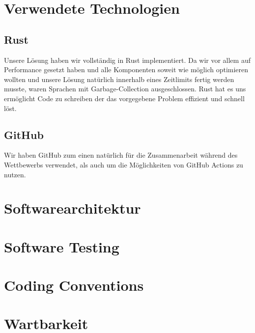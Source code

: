 \documentclass[12pt,a4paper]{article}
\begin{document}
\newpage
\section{Verwendete Technologien}

\subsection{Rust}
Unsere Lösung haben wir vollständig in Rust implementiert. Da wir vor allem auf Performance gesetzt haben und alle Komponenten soweit wie möglich optimieren wollten und unsere Lösung  natürlich innerhalb eines Zeitlimits fertig werden musste, waren Sprachen mit Garbage-Collection ausgeschlossen. Rust hat es uns ermöglicht Code zu schreiben der das vorgegebene Problem effizient und schnell löst.

\subsection{GitHub}
Wir haben GitHub zum einen natürlich für die Zusammenarbeit während des Wettbewerbs verwendet, als auch um die Möglichkeiten von GitHub Actions zu nutzen.


\section{Softwarearchitektur}

\section{Software Testing}

\section{Coding Conventions}

\section{Wartbarkeit}
\end{document}
